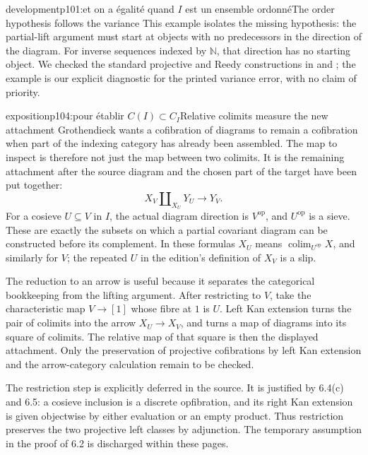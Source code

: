 \begin{dcomment}{development}{p101:et on a égalité quand $I$ est un ensemble ordonné}{The order hypothesis follows the variance}
This example isolates the missing hypothesis: the partial-lift argument must start at objects with no predecessors in the direction of the diagram. For inverse sequences indexed by $\mathbb N$, that direction has no starting object. We checked the standard projective and Reedy constructions in \citet[\S\S12.3 and~14.2]{Riehl2014} and \citet[Observation~4.16]{RiehlVerity2014Reedy}; the example is our explicit diagnostic for the printed variance error, with no claim of priority.
\end{dcomment}

\begin{dcomment}{exposition}{p104:pour établir $C(I) \subset C_I$}{Relative colimits measure the new attachment}
Grothendieck wants a cofibration of diagrams to remain a cofibration when part of the indexing category has already been assembled. The map to inspect is therefore not just the map between two colimits. It is the remaining attachment after the source diagram and the chosen part of the target have been put together:
\[
 X_V\amalg_{X_U}Y_U\longrightarrow Y_V.
\]
For a cosieve $U\subseteq V$ in $I$, the actual diagram direction is $V^{\mathrm{op}}$, and $U^{\mathrm{op}}$ is a sieve. These are exactly the subsets on which a partial covariant diagram can be constructed before its complement. In these formulas $X_U$ means $\operatorname{colim}_{U^{\mathrm{op}}}X$, and similarly for $V$; the repeated $U$ in the edition's definition of $X_V$ is a slip.

The reduction to an arrow is useful because it separates the categorical bookkeeping from the lifting argument. After restricting to $V$, take the characteristic map $V\to[1]$ whose fibre at $1$ is $U$. Left Kan extension turns the pair of colimits into the arrow $X_U\to X_V$, and turns a map of diagrams into its square of colimits. The relative map of that square is then the displayed attachment. Only the preservation of projective cofibrations by left Kan extension and the arrow-category calculation remain to be checked.

The restriction step is explicitly deferred in the source. It is justified by 6.4(c) and 6.5: a cosieve inclusion is a discrete opfibration, and its right Kan extension is given objectwise by either evaluation or an empty product. Thus restriction preserves the two projective left classes by adjunction. The temporary assumption in the proof of 6.2 is discharged within these pages.
\end{dcomment}

